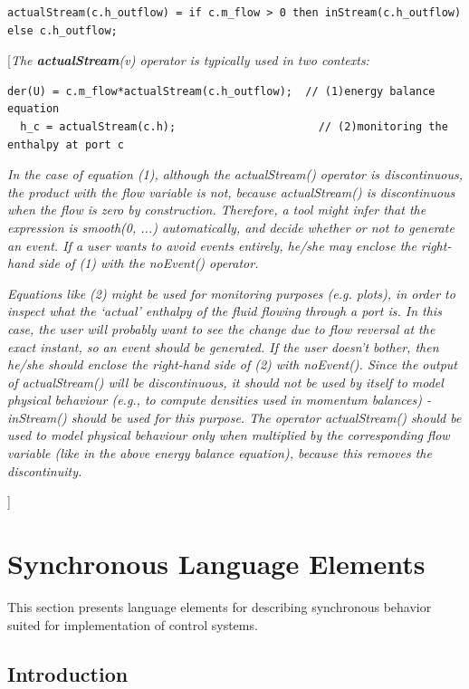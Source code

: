 \documentclass[10pt,a4paper]{report}
\def\doublelabel#1{\label{#1}}
\begin{document}
\begin{lstlisting}[language=modelica]
actualStream(c.h_outflow) = if c.m_flow > 0 then inStream(c.h_outflow) else c.h_outflow;
\end{lstlisting}

{[}\emph{The \textbf{actualStream}(v) operator is typically used in two
contexts:}
\begin{lstlisting}[language=modelica]
  der(U) = c.m_flow*actualStream(c.h_outflow);  // (1)energy balance equation
  h_c = actualStream(c.h);                      // (2)monitoring the enthalpy at port c
\end{lstlisting}
\emph{In the case of equation (1), although the actualStream() operator
is discontinuous, the product with the flow variable is not, because
actualStream() is discontinuous when the flow is zero by construction.
Therefore, a tool might infer that the expression is smooth(0, ...)
automatically, and decide whether or not to generate an event. If a user
wants to avoid events entirely, he/she may enclose the right-hand side
of (1) with the noEvent() operator. }

\emph{Equations like (2) might be used for monitoring purposes (e.g.
plots), in order to inspect what the `actual' enthalpy of the fluid
flowing through a port is. In this case, the user will probably want to
see the change due to flow reversal at the exact instant, so an event
should be generated. If the user doesn't bother, then he/she should
enclose the right-hand side of (2) with noEvent(). Since the output of
actualStream() will be discontinuous, it should not be used by itself to
model physical behaviour (e.g., to compute densities used in momentum
balances) - inStream() should be used for this purpose. The operator
actualStream() should be used to model physical behaviour only when
multiplied by the corresponding flow variable (like in the above energy
balance equation), because this removes the discontinuity.}

{]}

\chapter{Synchronous Language Elements}\doublelabel{synchronous-language-elements}

This section presents language elements for describing synchronous
behavior suited for implementation of control systems.

\section{Introduction}\doublelabel{introduction2}
\end{document}
